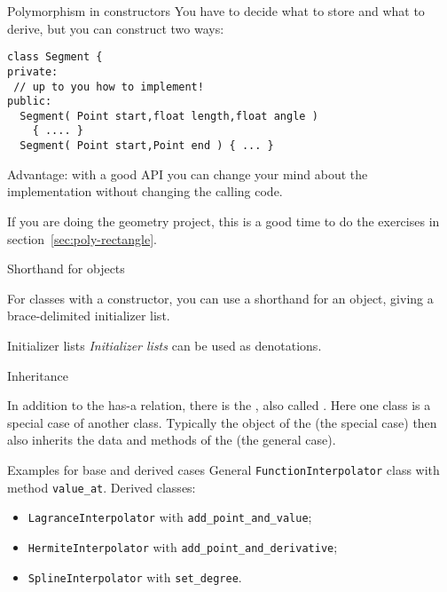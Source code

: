 \begin{slide}{Polymorphism in constructors}
  \label{sl:obj-poly-construct}
  You have to decide what to store and what to derive, but you can
  construct two ways:
  \lstset{style=snippetcode}
\begin{lstlisting}
class Segment {
private:
 // up to you how to implement!
public:
  Segment( Point start,float length,float angle )
    { .... }
  Segment( Point start,Point end ) { ... }
\end{lstlisting}
Advantage: with a good API you can change your mind about the
implementation without changing the calling code.
\end{slide}

\begin{exercise}
  If you are doing the geometry project, this is a good time to
  do the exercises in section~\ref{sec:poly-rectangle}.
\end{exercise}

 {Shorthand for objects}

For classes with a constructor, you can use a shorthand
for an object, giving a brace-delimited initializer list.

\begin{block}{Initializer lists}
  \label{sl:class-inlist}
  \emph{Initializer lists} can be used as denotations.
\end{block}

 {Inheritance}
\label{sec:inheritance}

In addition to the has-a relation, there is the , also called . Here one class is
a special case of another class.
Typically the object of the  (the special
case) then also inherits the data and methods of the
 (the general case).

\begin{block}{Examples for base and derived cases}
  \label{sl:derived-example}
  General \lstinline{FunctionInterpolator} class with method \lstinline{value_at}.
  Derived classes:
  \begin{itemize}
  \item \lstinline{LagranceInterpolator} with \lstinline{add_point_and_value};
  \item \lstinline{HermiteInterpolator} with \lstinline{add_point_and_derivative};
  \item \lstinline{SplineInterpolator} with \lstinline{set_degree}.
  \end{itemize}
\end{block}

